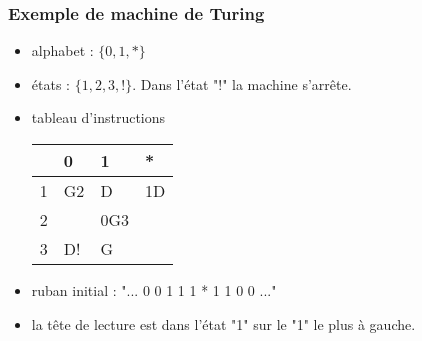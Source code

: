 \begin{frame}
  \frametitle{Exemple de machine de Turing}
  \begin{itemize}
    \item alphabet : $\{0,1,*\}$
    \item états : $\{1, 2, 3, !\}$. Dans l'état "!" la machine s'arrête.
    \item tableau d'instructions
\begin{center}    
\renewcommand{\arraystretch}{1.5}
\begin{tabular}{|l|l|l|l|} \hline
  & 0  & 1   & *  \\ \hline
1 & G2 & D   & 1D \\ \hline
2 &    & 0G3 &    \\ \hline
3 & D! & G   &    \\ \hline
\end{tabular}
\end{center}
    \item ruban initial : "... 0 0 1 1 1 * 1 1 0 0 ..."
    \item la tête de lecture est dans l'état "1" sur le "1" le plus à gauche.
  \end{itemize}
\end{frame}

